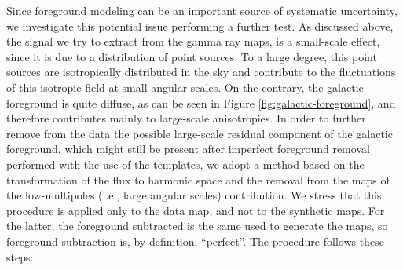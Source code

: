 Since foreground modeling can be an important source of systematic uncertainty,  we investigate this potential issue performing a further test. 
As discussed above, the signal we try to extract from the gamma ray maps, is a small-scale effect, since it is due to a distribution of point sources. To a large degree, this point sources are isotropically distributed in the sky and contribute to the fluctuations of this isotropic field at small angular scales. On the contrary, the galactic foreground is quite diffuse, as can be seen in Figure \ref{fig:galactic-foreground}, and therefore contributes mainly to large-scale anisotropies. 
In order to further remove from the data the possible large-scale residual component of the galactic foreground, which might still be present after imperfect foreground removal performed with the use of the templates, we adopt a method based on the transformation of the flux to harmonic space and the removal from the maps of the low-multipoles (i.e., large angular scales) contribution. 
We stress that this procedure is applied only to the \fermi data map, and  not to the synthetic maps. For the latter, the foreground subtracted is the same used to generate the maps, so foreground subtraction is, by definition, ``perfect''. 
The procedure follows these steps:

